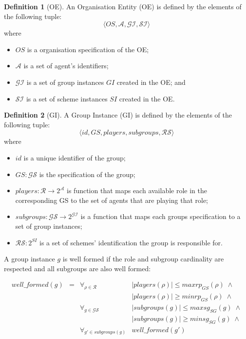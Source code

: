 \documentclass{article}
\newcommand{\set}[1]{\mathcal{#1}}
\theoremstyle{definition} \newtheorem{definition}{Definition}
\begin{document}
\begin{definition}[OE]
  An Organisation Entity (OE) is defined by the elements of the following tuple:
  \begin{displaymath}
    \langle OS,  \mathcal{A}, \mathcal{GI}, \mathcal{SI} \rangle
  \end{displaymath}
  where
  \begin{itemize}
  \item $OS$ is a organisation specification of the OE;
  \item $\mathcal{A}$ is a set of agent's identifiers;
  \item $\mathcal{GI}$ is a set of group instances $GI$ created in the OE; and
  \item $\mathcal{SI}$ is a set of scheme instances $SI$ created in the OE.
  \end{itemize}
\end{definition}

\begin{definition}[GI]
  A Group Instance (GI) is defined by the elements of the following tuple:
  \begin{displaymath}
    \langle id, GS, players, subgroups, \set{RS} \rangle
  \end{displaymath}
  where
  \begin{itemize}
  \item $id$ is a unique identifier of the group;
  \item $GS : \set{GS}$ is the specification of the group;
  \item $players : \set{R} \rightarrow 2^{\set{A}}$ is
    function that maps each available role in the corresponding GS
    to the set of agents that are playing that role;
  \item $subgroups: \set{GS} \rightarrow 2^{\set{GI}}$ is a
    function that maps each groups specification to a set of group
    instances;
  \item $\set{RS} : 2^{SI}$ is a set of schemes' identification the group is
    responsible for.
  \end{itemize}
\end{definition}

A group instance $g$ is well formed if the role and subgroup cardinality are
respected and all subgroups are also well formed:

\begin{displaymath}
  \begin{array}{rcll}
  well\_formed(g) & = & \forall_{\rho \in \set{R}} & |players(\rho)| \leq maxrp_{GS}(\rho) \; \land \\
                              & & &  |players(\rho)| \geq minrp_{GS}(\rho) \; \land\\
                              & &  \forall_{g \in \set{GS}} & |subgroups(g)| \leq maxsg_{SG}(g) \; \land\\
                              & & & |subgroups(g)| \geq minsg_{SG}(g) \; \land\\
                              & &  \forall_{g' \in subgroups(g)} & well\_formed(g')
  \end{array}
\end{displaymath}
\end{document}
